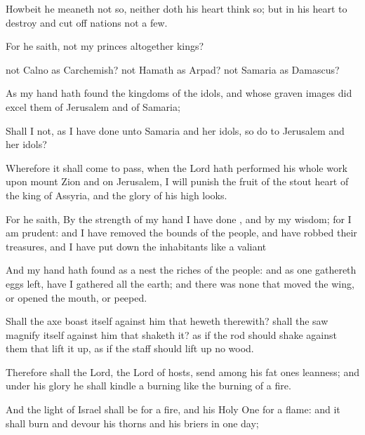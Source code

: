 {Howbeit he
meaneth not so, neither doth his
heart
think so; but
{} in his
heart to
destroy and cut
off
nations not a
few.

For he
saith,
{} not my
princes
altogether
kings?

 not
Calno as
Carchemish?
{} not
Hamath as
Arpad?
{} not
Samaria as
Damascus?

As my
hand hath
found the
kingdoms of the
idols, and whose graven
images did excel them of
Jerusalem and of
Samaria;

Shall I not, as I have
done unto
Samaria and her
idols, so
do to
Jerusalem and her
idols?

Wherefore it shall come to pass,
{} when the
Lord hath
performed his whole
work upon
mount
Zion and on
Jerusalem, I will
punish the
fruit of the
stout
heart of the
king of
Assyria, and the
glory of his
high
looks.

For he
saith, By the
strength of my
hand I have
done
{}, and by my
wisdom; for I am
prudent: and I have
removed the
bounds of the
people, and have
robbed their
treasures, and I have put
down the
inhabitants like a
valiant
{}

And my
hand hath
found as a
nest the
riches of the
people: and as one
gathereth
eggs
{}
left, have I
gathered all the
earth; and there was none that
moved the
wing, or
opened the
mouth, or
peeped.

Shall the
axe
boast itself against him that
heweth therewith?
{} shall the
saw
magnify itself against him that
shaketh it? as if the
rod should
shake
{} against them that lift it
up,
{} as if the
staff should lift
up
{} no
wood.

Therefore shall the
Lord, the
Lord of
hosts,
send among his fat
ones
leanness; and under his
glory he shall
kindle a
burning like the burning of a
fire.

And the
light of
Israel shall be for a
fire, and his Holy
One for a
flame: and it shall
burn and
devour his
thorns and his
briers in
one
day;

}
